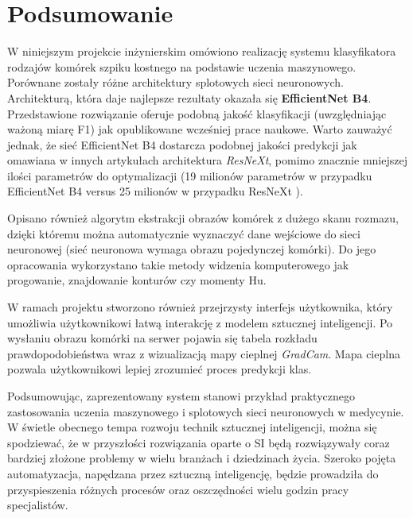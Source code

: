 \chapter{Podsumowanie}

W niniejszym projekcie inżynierskim omówiono realizację systemu klasyfikatora rodzajów komórek szpiku kostnego na podstawie uczenia maszynowego.
Porównane zostały różne architektury splotowych sieci neuronowych.
Architekturą, która daje najlepsze rezultaty okazała się \textbf{EfficientNet B4}.
Przedstawione rozwiązanie oferuje podobną jakość klasyfikacji (uwzględniając ważoną miarę F1) jak opublikowane wcześniej prace naukowe.
Warto zauważyć jednak, że sieć EfficientNet B4 dostarcza podobnej jakości predykcji jak omawiana w innych artykułach architektura \textit{ResNeXt}, pomimo znacznie mniejszej ilości parametrów do optymalizacji (19 milionów parametrów w przypadku EfficientNet B4 versus 25 milionów w przypadku ResNeXt \cite{resnext}).

Opisano również algorytm ekstrakcji obrazów komórek z dużego skanu rozmazu, dzięki któremu można automatycznie wyznaczyć dane wejściowe do sieci neuronowej (sieć neuronowa wymaga obrazu pojedynczej komórki).
Do jego opracowania wykorzystano takie metody widzenia komputerowego jak progowanie, znajdowanie konturów czy momenty Hu.

W ramach projektu stworzono również przejrzysty interfejs użytkownika, który umożliwia użytkownikowi łatwą interakcję z modelem sztucznej inteligencji.
Po wysłaniu obrazu komórki na serwer pojawia się tabela rozkładu prawdopodobieństwa wraz z wizualizacją mapy cieplnej \textit{GradCam}.
Mapa cieplna pozwala użytkownikowi lepiej zrozumieć proces predykcji klas.

Podsumowując, zaprezentowany system stanowi przykład praktycznego zastosowania uczenia maszynowego i splotowych sieci neuronowych w medycynie.
W świetle obecnego tempa rozwoju technik sztucznej inteligencji, można się spodziewać, że w przyszłości rozwiązania oparte o SI będą rozwiązywały coraz bardziej złożone problemy w wielu branżach i dziedzinach życia.
Szeroko pojęta automatyzacja, napędzana przez sztuczną inteligencję, będzie prowadziła do przyspieszenia różnych procesów oraz oszczędności wielu godzin pracy specjalistów.